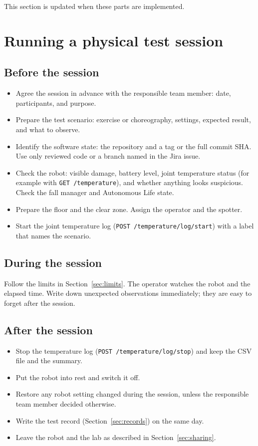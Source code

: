 \documentclass[12pt,a4paper]{article}
\begin{document}
This section is updated when these parts are implemented.

\section{Running a physical test session}
\label{sec:session}

\subsection{Before the session}

\begin{itemize}
\item[$\square$] Agree the session in advance with the responsible team member: date, participants, and purpose.
\item[$\square$] Prepare the test scenario: exercise or choreography, settings, expected result, and what to observe.
\item[$\square$] Identify the software state: the repository and a tag or the full commit SHA. Use only reviewed code or a branch named in the Jira issue.
\item[$\square$] Check the robot: visible damage, battery level, joint temperature status (for example with \texttt{GET /temperature}), and whether anything looks suspicious. Check the fall manager and Autonomous Life state.
\item[$\square$] Prepare the floor and the clear zone. Assign the operator and the spotter.
\item[$\square$] Start the joint temperature log (\texttt{POST /temperature/log/start}) with a label that names the scenario.
\end{itemize}

\subsection{During the session}

Follow the limits in Section~\ref{sec:limits}. The operator watches the robot and the elapsed time. Write down unexpected observations immediately; they are easy to forget after the session.

\subsection{After the session}

\begin{itemize}
\item[$\square$] Stop the temperature log (\texttt{POST /temperature/log/stop}) and keep the CSV file and the summary.
\item[$\square$] Put the robot into rest and switch it off.
\item[$\square$] Restore any robot setting changed during the session, unless the responsible team member decided otherwise.
\item[$\square$] Write the test record (Section~\ref{sec:records}) on the same day.
\item[$\square$] Leave the robot and the lab as described in Section~\ref{sec:sharing}.
\end{itemize}
\end{document}
